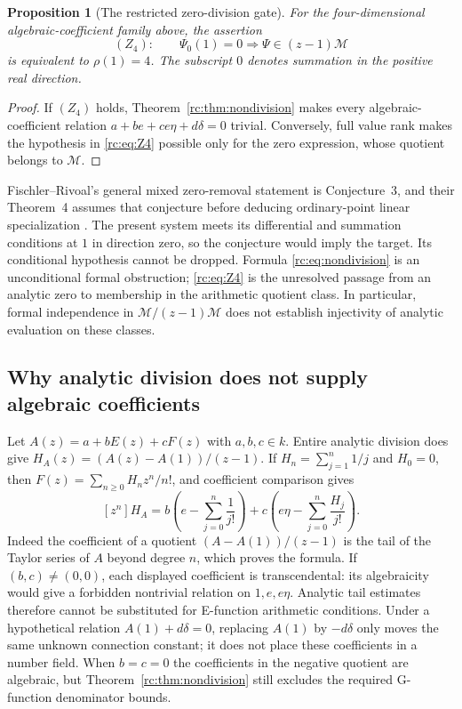 \documentclass[11pt,a4paper]{article}
\newtheorem{proposition}[theorem]{Proposition}
\theoremstyle{definition}
\theoremstyle{remark}
\theoremstyle{plain}
\numberwithin{equation}{section}
\providecommand{\rcM}{\mathcal M}
\begin{document}
\begin{proposition}[The restricted zero-division gate]\label{rc:prop:gate}
For the four-dimensional algebraic-coefficient family above, the assertion
\begin{equation}\label{rc:eq:Z4}
 (Z_4):\qquad \Psi_0(1)=0\Longrightarrow\Psi\in(z-1)\rcM
\end{equation}
is equivalent to $\rho(1)=4$.  The subscript $0$ denotes summation in
the positive real direction.
\end{proposition}

\begin{proof}
If $(Z_4)$ holds, Theorem~\ref{rc:thm:nondivision} makes every
algebraic-coefficient relation
$a+be+ce\eta+d\delta=0$ trivial.  Conversely, full value rank makes
the hypothesis in \eqref{rc:eq:Z4} possible only for the zero expression,
whose quotient belongs to $\rcM$.
\end{proof}

Fischler--Rivoal's general mixed zero-removal statement is Conjecture~3,
and their Theorem~4 assumes that conjecture before deducing ordinary-point
linear specialization \cite{FRmixed}.  The present system
meets its differential and summation conditions at $1$ in direction zero,
so the conjecture would imply the target.  Its conditional hypothesis
cannot be dropped.  Formula \eqref{rc:eq:nondivision} is an unconditional
formal obstruction; \eqref{rc:eq:Z4} is the unresolved passage from an
analytic zero to membership in the arithmetic quotient class.  In
particular, formal independence in $\rcM/(z-1)\rcM$ does not establish
injectivity of analytic evaluation on these classes.

\subsection{Why analytic division does not supply algebraic coefficients}

Let $A(z)=a+bE(z)+cF(z)$ with $a,b,c\in k$.  Entire analytic division
does give $H_A(z)=(A(z)-A(1))/(z-1)$.  If
$H_n=\sum_{j=1}^n1/j$ and $H_0=0$, then
$F(z)=\sum_{n\ge0}H_nz^n/n!$, and coefficient comparison gives
\begin{equation}\label{rc:eq:analytic-tails}
 [z^n]H_A=
 b\left(e-\sum_{j=0}^n\frac1{j!}\right)
 +c\left(e\eta-\sum_{j=0}^n\frac{H_j}{j!}\right).
\end{equation}
Indeed the coefficient of a quotient $(A-A(1))/(z-1)$ is the tail of the
Taylor series of $A$ beyond degree $n$, which proves the formula.  If
$(b,c)\ne(0,0)$, each displayed coefficient is transcendental: its
algebraicity would give a forbidden nontrivial relation on $1,e,e\eta$.
Analytic tail estimates therefore cannot be substituted for E-function
arithmetic conditions.  Under a hypothetical relation $A(1)+d\delta=0$,
replacing $A(1)$ by $-d\delta$ only moves the same unknown connection
constant; it does not place these coefficients in a number field.
When $b=c=0$ the coefficients in the negative quotient are algebraic,
but Theorem~\ref{rc:thm:nondivision} still excludes the required
G-function denominator bounds.
\end{document}
